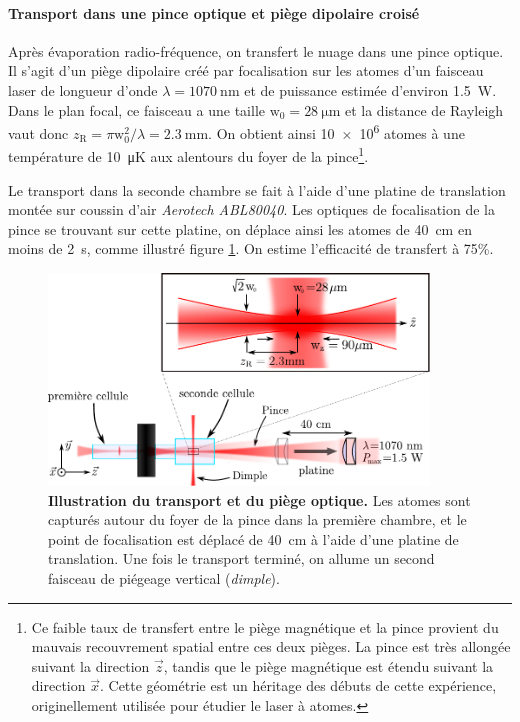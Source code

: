 \paragraph*{Transport dans une pince optique et piège dipolaire croisé}
Après évaporation radio-fréquence, on transfert le nuage dans une pince optique. Il s'agit d'un piège dipolaire créé par focalisation sur les atomes d'un faisceau laser de longueur d'onde $\lambda=\SI{1070}{\nano\metre}$ et de puissance estimée d'environ \SI{1.5}{\watt}. Dans le plan focal, ce faisceau a une taille $\mathrm{w}_{\mathrm{0}}=\SI{28}{\micro\metre}$ et la distance de Rayleigh vaut donc $z_{\mathrm{R}}= \pi \mathrm{w}_{\mathrm{0}}^2 / \lambda=\SI{2.3}{\milli\metre}$. On obtient ainsi \num{10e6} atomes à une température de \SI{10}{\micro\kelvin} aux alentours du foyer de la pince\footnote{Ce faible taux de transfert entre le piège magnétique et la pince provient du mauvais recouvrement spatial entre ces deux pièges. La pince est très allongée suivant la direction $\vec{z}$, tandis que le piège magnétique est étendu suivant la direction $\vec{x}$. Cette géométrie est un héritage des débuts de cette expérience, originellement utilisée pour étudier le laser à atomes.}.

Le transport dans la seconde chambre se fait à l'aide d'une platine de translation montée sur coussin d'air \emph{Aerotech ABL80040}. Les optiques de focalisation de la pince se trouvant sur cette platine, on déplace ainsi les atomes de \SI{40}{\centi\metre} en moins de \SI{2}{\second}, comme illustré figure \ref{fig:piege_optique}. On estime l'efficacité de transfert à 75\%.%

\begin{figure}
\centering
\includegraphics[width=0.9\textwidth]{Fig/BEC_manip/piege_optique2.pdf}
\caption{\textbf{Illustration du transport et du piège optique.} Les atomes sont capturés autour du foyer de la pince dans la première chambre, et le point de focalisation est déplacé de \SI{40}{\centi\metre} à l'aide d'une platine de translation. Une fois le transport terminé, on allume un second faisceau de piégeage vertical (\emph{dimple}).}
\label{fig:piege_optique}
\end{figure}

